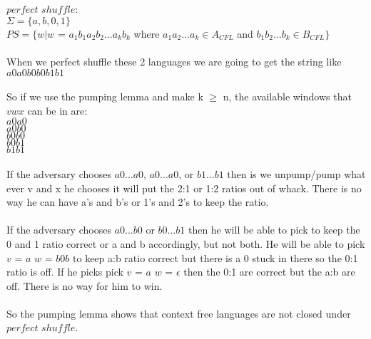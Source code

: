 \documentclass[11pt, oneside]{article}   	%
\begin{document}
\\
\\$perfect$ $shuffle$:
\\ $\Sigma = \{a,b,0,1\}$ 
\\$PS=\{ w | w$ = $a_1b_1a_2b_2 ... a_kb_k$ where $a_1a_2 ... a_k \in A_{CFL}$ and $b_1b_2 ... b_k \in B_{CFL} \}$
\\
\\When we perfect shuffle these 2 languages we are going to get the string like $a0a0b0b0b1b1$
\\
\\So if we use the pumping lemma and make k $\geq$ n, the available windows that $vwx$ can be in are:
\\$a0a0$
\\$a0b0$
\\$b0b0$
\\$b0b1$
\\$b1b1$
\\
\\If the adversary chooses $a0...a0$,  $a0...a0$, or $b1 ...b1$ then is we unpump/pump what ever v and x he chooses it will put the 2:1 or 1:2 ratios out of whack. There is no way he can have a's and b's or 1's and 2's to keep the ratio.
\\
\\If the adversary chooses $a0...b0$ or $b0 ... b1$ then he will be able to pick to keep the 0 and 1 ratio correct or a and b accordingly, but not both. He will be able to pick $v$ = $a$ $w$ = $b0b$ to keep a:b ratio correct but there is a 0 stuck in there so the 0:1 ratio is off. If he picks pick $v$ = $a$ $w$ = $\epsilon$ then the 0:1 are correct but the a:b are off. There is no way for him to win.
\\
\\So the pumping lemma shows that context free languages are not closed under $perfect$ $shuffle$.
\end{document}

